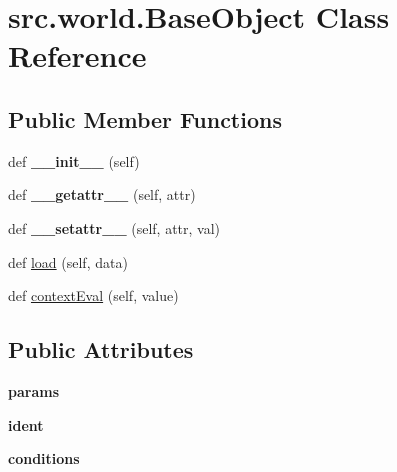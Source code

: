 \hypertarget{classsrc_1_1world_1_1_base_object}{}\section{src.\+world.\+Base\+Object Class Reference}
\label{classsrc_1_1world_1_1_base_object}
\subsection*{Public Member Functions}
\begin{DoxyCompactItemize}
\item 
\hypertarget{classsrc_1_1world_1_1_base_object_a7d815aabf9c8623e230d489bae66a7f2}{}\label{classsrc_1_1world_1_1_base_object_a7d815aabf9c8623e230d489bae66a7f2} 
def {\bfseries \+\_\+\+\_\+init\+\_\+\+\_\+} (self)
\item 
\hypertarget{classsrc_1_1world_1_1_base_object_a2174d4c31c2676702a43ae1f98cb9345}{}\label{classsrc_1_1world_1_1_base_object_a2174d4c31c2676702a43ae1f98cb9345} 
def {\bfseries \+\_\+\+\_\+getattr\+\_\+\+\_\+} (self, attr)
\item 
\hypertarget{classsrc_1_1world_1_1_base_object_ae012a94ebef46b2e0a64981cf9257e68}{}\label{classsrc_1_1world_1_1_base_object_ae012a94ebef46b2e0a64981cf9257e68} 
def {\bfseries \+\_\+\+\_\+setattr\+\_\+\+\_\+} (self, attr, val)
\item 
def \hyperlink{classsrc_1_1world_1_1_base_object_a574e9fcdbf71cbd28518816acbe61504}{load} (self, data)
\item 
def \hyperlink{classsrc_1_1world_1_1_base_object_aeee31be3e8c0ada3fb6c7962cdd12e75}{context\+Eval} (self, value)
\end{DoxyCompactItemize}
\subsection*{Public Attributes}
\begin{DoxyCompactItemize}
\item 
\hypertarget{classsrc_1_1world_1_1_base_object_a99cb01fe7d043aff278b0f59b677ee59}{}\label{classsrc_1_1world_1_1_base_object_a99cb01fe7d043aff278b0f59b677ee59} 
{\bfseries params}
\item 
\hypertarget{classsrc_1_1world_1_1_base_object_a8a59faf6886ed33ceb35530c593b5ee9}{}\label{classsrc_1_1world_1_1_base_object_a8a59faf6886ed33ceb35530c593b5ee9} 
{\bfseries ident}
\item 
\hypertarget{classsrc_1_1world_1_1_base_object_ab7ebe5ac874f4529ab6fdac015035bdc}{}\label{classsrc_1_1world_1_1_base_object_ab7ebe5ac874f4529ab6fdac015035bdc} 
{\bfseries conditions}
\end{DoxyCompactItemize}
